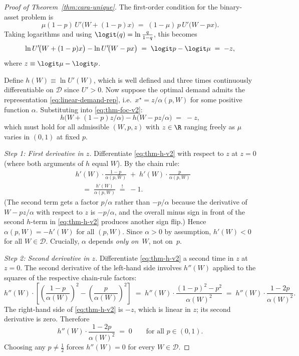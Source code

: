 \begin{proof}[Proof of Theorem~\ref{thm:cara-unique}]
The first-order condition for the binary-asset problem is
\[
   \mu(1-p)\,U'\!\bigl(W+(1-p)x\bigr) \;=\; (1-\mu)\,p\,U'\!\bigl(W-px\bigr).
\]
Taking logarithms and using $\logit(q)=\ln\tfrac{q}{1-q}$, this
becomes
\begin{equation}
   \ln U'\!\bigl(W+(1-p)x\bigr) - \ln U'\!\bigl(W-px\bigr)
   \;=\; \logit p - \logit\mu
   \;=\; -z,
\label{eq:thm-foc-v2}
\end{equation}
where $z\equiv\logit\mu-\logit p$.

Define $h(W)\equiv\ln U'(W)$, which is well defined and three times
continuously differentiable on $\mathcal{D}$ since $U'>0$.
Now suppose the optimal demand admits the representation
\eqref{eq:linear-demand-rep}, i.e.\ $x^{\star}=z/\alpha(p,W)$ for some
positive function $\alpha$.  Substituting into \eqref{eq:thm-foc-v2}:
\begin{equation}
   h\!\bigl(W+(1-p)z/\alpha\bigr) - h\!\bigl(W-pz/\alpha\bigr) \;=\; -z,
\label{eq:thm-h-v2}
\end{equation}
which must hold for all admissible $(W,p,z)$ with $z\in\R$ ranging freely
as $\mu$ varies in $(0,1)$ at fixed $p$.

\emph{Step 1: First derivative in $z$.} Differentiate
\eqref{eq:thm-h-v2} with respect to $z$ at $z=0$ (where both arguments of
$h$ equal $W$). By the chain rule:
\begin{align*}
   &h'(W)\cdot\frac{1-p}{\alpha(p,W)}
   \;+\; h'(W)\cdot\frac{p}{\alpha(p,W)} \\
   &\quad=\; \frac{h'(W)}{\alpha(p,W)}
   \;\stackrel{!}{=}\; -1.
\end{align*}
(The second term gets a factor $p/\alpha$ rather than $-p/\alpha$
because the derivative of $W-pz/\alpha$ with respect to $z$ is
$-p/\alpha$, and the overall minus sign in front of the second $h$-term
in \eqref{eq:thm-h-v2} produces another sign flip.)
Hence $\alpha(p,W)=-h'(W)$ for all $(p,W)$.
Since $\alpha>0$ by assumption, $h'(W)<0$ for all $W\in\mathcal{D}$.
Crucially, $\alpha$ depends \emph{only on~$W$}, not on~$p$.

\emph{Step 2: Second derivative in $z$.} Differentiate
\eqref{eq:thm-h-v2} a second time in $z$ at $z=0$. The second
derivative of the left-hand side involves $h''(W)$ applied to the
squares of the respective chain-rule factors:
\[
   h''(W)\cdot\!\left[\!\left(\frac{1-p}{\alpha(W)}\right)^{\!2}
   - \left(\frac{p}{\alpha(W)}\right)^{\!2}\right]
   \;=\; h''(W)\cdot\frac{(1-p)^{2}-p^{2}}{\alpha(W)^{2}}
   \;=\; h''(W)\cdot\frac{1-2p}{\alpha(W)^{2}}.
\]
The right-hand side of \eqref{eq:thm-h-v2} is $-z$, which is linear in
$z$; its second derivative is zero. Therefore
\[
   h''(W)\cdot\frac{1-2p}{\alpha(W)^{2}} \;=\; 0
   \qquad \text{for all } p\in(0,1).
\]
Choosing any $p\neq\tfrac12$ forces $h''(W)=0$ for every
$W\in\mathcal{D}$.


\end{proof}
